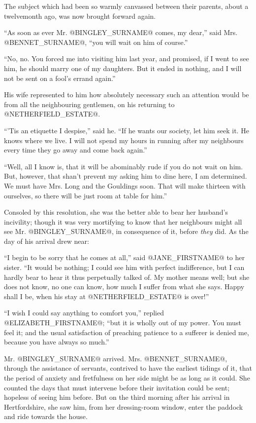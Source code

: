 The subject which had been so warmly canvassed between their parents,
about a twelvemonth ago, was now brought forward again.

``As soon as ever Mr. @BINGLEY_SURNAME@ comes, my dear,'' said Mrs. @BENNET_SURNAME@, ``you
will wait on him of course.''

``No, no. You forced me into visiting him last year, and promised, if I
went to see him, he should marry one of my daughters. But it ended in
nothing, and I will not be sent on a fool's errand again.''

His wife represented to him how absolutely necessary such an attention
would be from all the neighbouring gentlemen, on his returning to
@NETHERFIELD_ESTATE@.

``'Tis an etiquette I despise,'' said he. ``If he wants our society,
let him seek it. He knows where we live. I will not spend my hours
in running after my neighbours every time they go away and come back
again.''

``Well, all I know is, that it will be abominably rude if you do not wait
on him. But, however, that shan't prevent my asking him to dine here, I
am determined. We must have Mrs. Long and the Gouldings soon. That will
make thirteen with ourselves, so there will be just room at table for
him.''

Consoled by this resolution, she was the better able to bear her
husband's incivility; though it was very mortifying to know that her
neighbours might all see Mr. @BINGLEY_SURNAME@, in consequence of it, before
\textit{they} did. As the day of his arrival drew near:

``I begin to be sorry that he comes at all,'' said @JANE_FIRSTNAME@ to her sister. ``It
would be nothing; I could see him with perfect indifference, but I can
hardly bear to hear it thus perpetually talked of. My mother means well;
but she does not know, no one can know, how much I suffer from what she
says. Happy shall I be, when his stay at @NETHERFIELD_ESTATE@ is over!''

``I wish I could say anything to comfort you,'' replied @ELIZABETH_FIRSTNAME@; ``but it
is wholly out of my power. You must feel it; and the usual satisfaction
of preaching patience to a sufferer is denied me, because you have
always so much.''

Mr. @BINGLEY_SURNAME@ arrived. Mrs. @BENNET_SURNAME@, through the assistance of servants,
contrived to have the earliest tidings of it, that the period of anxiety
and fretfulness on her side might be as long as it could. She counted
the days that must intervene before their invitation could be sent;
hopeless of seeing him before. But on the third morning after his
arrival in Hertfordshire, she saw him, from her dressing-room window,
enter the paddock and ride towards the house.

